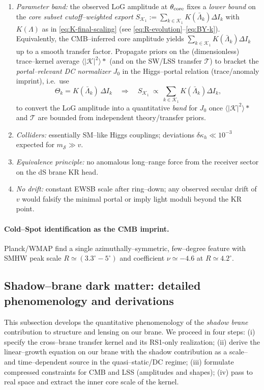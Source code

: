 \documentclass[10pt]{article}
\theoremstyle{definition}
\theoremstyle{plain}
\begin{document}
\begin{enumerate}[leftmargin=2.1em,label=\Roman*. ,itemsep=2pt]
\item \emph{Parameter band:} the observed LoG amplitude at $\theta_{\rm core}$ fixes a \emph{lower bound} on the
\emph{core subset cutoff–weighted export}
$S_{\mathcal K_1}:=\sum_{k\in\mathcal K_1}K(\bar\Lambda_k)\Delta I_k$ with
$K(\Lambda)$ as in \eqref{eq:K-final-scaling} (see \eqref{eq:R-evolution}–\eqref{eq:BY-k}). Equivalently, the CMB–inferred
core amplitude yields $\sum_{k\in\mathcal K_1}K(\bar\Lambda_k)\Delta I_k$ up to a smooth transfer factor. Propagate
priors on the (dimensionless) trace–kernel average $\langle|\mathcal K|^2\rangle*$
(and on the SW/LSS transfer $\mathcal T$) to bracket the \emph{portal–relevant DC normalizer} $J_0$ in the
Higgs–portal relation (trace/anomaly imprint), i.e.\ use
\[
\Theta_k=K(\bar\Lambda_k)\,\Delta I_k
\quad\Longrightarrow\quad
S_{\mathcal K_1}\ \propto\ \sum_{k\in\mathcal K_1}K(\bar\Lambda_k)\Delta I_k,
\]
to convert the LoG amplitude into a quantitative \emph{band} for $J_0$ once $\langle|\mathcal K|^2\rangle*$ and
$\mathcal T$ are bounded from independent theory/transfer priors.
\item \emph{Colliders:} essentially SM–like Higgs couplings; deviations \(\delta\kappa_h\ll 10^{-3}\)
expected for \(m_{\mathcal S}\gg v\).
\item \emph{Equivalence principle:} no anomalous long–range force from the receiver sector on the
dS brane KR head.
\item \emph{No drift:} constant EWSB scale after ring–down; any observed secular drift of \(v\) would
falsify the minimal portal or imply light moduli beyond the KR point.
\end{enumerate}
\paragraph{Cold–Spot identification as the CMB imprint.}\label{par:uom-main-171}
Planck/WMAP find a single azimuthally–symmetric, few–degree feature with SMHW
peak scale \(R\simeq(3.3^\circ\!-\!5^\circ)\) and coefficient \(\nu\simeq-4.6\) at \(R\simeq 4.2^\circ\).

\subsection{Shadow--brane dark matter: detailed phenomenology and derivations}
\label{subsec:shadow-brane-dm-phenom}

This subsection develops the quantitative phenomenology of the \emph{shadow brane}
contribution to structure and lensing on our brane. We proceed in four steps:
(i) specify the cross--brane transfer kernel and its RS1-only realization;
(ii) derive the linear–growth equation on our brane with the shadow contribution as a
scale– and time–dependent source in the quasi–static/DC regime;
(iii) formulate compressed constraints for CMB and LSS (amplitudes and shapes);
(iv) pass to real space and extract the inner core scale of the kernel.
\end{document}
